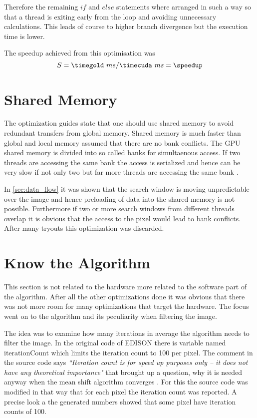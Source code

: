 Therefore the remaining $if$ and $else$ statements where arranged in such a way
so that a thread is exiting early from the loop and avoiding unnecessary
calculations. This leads of course to higher branch divergence but the execution
time is lower. 

The speedup achieved from this optimisation was
\fpDiv{\speedup}{\timegold}{\timecuda}
\begin{equation*}\label{eq:speedup6}
	S = \timegold\ ms/\timecuda\ ms = \speedup
\end{equation*}



\section{Shared Memory} %
\label{sec:shared_memory}
The optimization guides state that one should use shared memory to avoid 
redundant transfers from global memory. Shared memory is much faster than global
and local memory assumed that there are no bank conflicts. The \gls{GPU} shared
memory is divided into so called banks for simultaenous access. If two threads
are accessing the same bank the access is serialized and hence can be very slow
if not only two but far more threads are accessing the same bank 
\citep{citeulike:6584051}.

In \autoref{sec:data_flow} it was shown that the search window is moving
unpredictable over the image and hence preloading of data into the shared memory
is not possible. Furthermore if two or more search windows from different
threads overlap it is obvious that the access to the pixel would lead to bank
conflicts. After many tryouts this optimization was discarded. 

\section{Know the Algorithm} %
\label{sec:know_the_algo}
This section is not related to the hardware more related to the software part of 
the algorithm. After all the other optimizations done it was obvious that there
was not more room for many optimizations that target the hardware. The focus went
on to the algorithm and its peculiarity when filtering the image. 

The idea was to examine how many iterations in average the algorithm needs to
filter the image. In the original code of \gls{EDISON} there is variable named
\textsf{iterationCount} which limits the iteration count to 100 per pixel. The
comment in the source code says \textit{``Iteration count is for speed up
purposes only -- it does not have any theoretical importance"} that brought up a
question, why it is needed anyway when the mean shift algorithm converges
\citep{citeulike:462300}. For this the source code was modified in that way
that for each pixel the iteration count was reported. A precise look a the 
generated numbers showed that some pixel have iteration counts of 100. 


